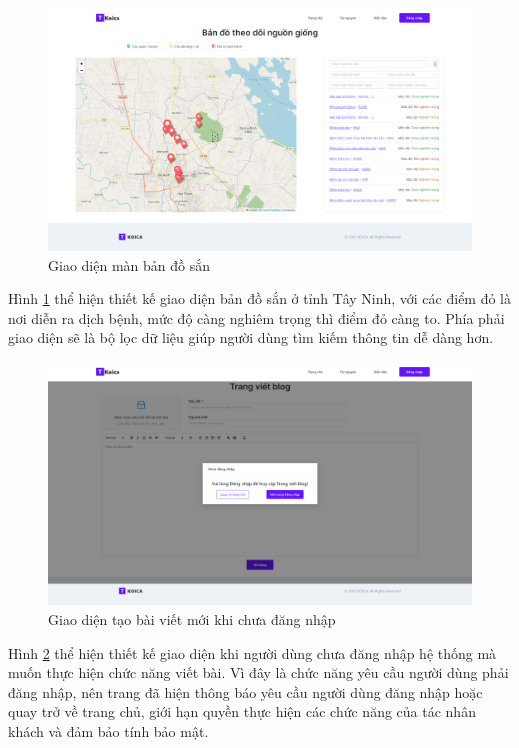 \documentclass[./../main.tex]{subfiles}
\begin{document}
\begin{figure}[H]
\centering
    \includegraphics[width=\textwidth,height=\textheight,keepaspectratio]{./img/kltn_map.png}
    \caption{Giao diện màn bản đồ sắn}
    \label{ui:kltn_map}
\end{figure}
Hình \ref{ui:kltn_map} thể hiện thiết kế giao diện bản đồ sắn ở tỉnh Tây Ninh, với các điểm đỏ là nơi diễn ra dịch bệnh, mức độ càng nghiêm trọng thì điểm đỏ càng to. Phía phải giao diện sẽ là bộ lọc dữ liệu giúp người dùng tìm kiếm thông tin dễ dàng hơn.

\begin{figure}[H]
\centering
    \includegraphics[width=\textwidth,height=\textheight,keepaspectratio]{./img/kltn_guest_createblog.png}
    \caption{Giao diện tạo bài viết mới khi chưa đăng nhập}
    \label{ui:kltn_guest_createblog}
\end{figure}
Hình \ref{ui:kltn_guest_createblog} thể hiện thiết kế giao diện khi người dùng chưa đăng nhập hệ thống mà muốn thực hiện chức năng viết bài. Vì đây là chức năng yêu cầu người dùng phải đăng nhập, nên trang đã hiện thông báo yêu cầu người dùng đăng nhập hoặc quay trở về trang chủ, giới hạn quyền thực hiện các chức năng của tác nhân khách và đảm bảo tính bảo mật.
\end{document}
